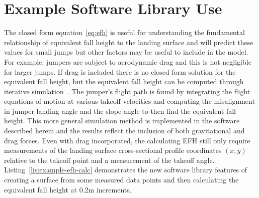 \documentclass[smallextended]{svjour3}       %
\begin{document}
\section{Example Software Library Use}
\label{sec:example}
%
The closed form equation~\ref{eq:efh} is useful for understanding the
fundamental relationship of equivalent fall height to the landing surface and
will predict these values for small jumps but other factors may be useful to
include in the model. For example, jumpers are subject to aerodynamic drag and
this is not negligible for larger jumps. If drag is included there is no closed
form solution for the equivalent fall height, but the equivalent fall height
can be computed through iterative simulation~\cite{Levy2015}. The jumper's
flight path is found by integrating the flight equations of motion at various
takeoff velocities and computing the misalignment in jumper landing angle and
the slope angle to then find the equivalent fall height. This more general
simulation method is implemented in the software described herein and the
results reflect the inclusion of both gravitational and drag forces. Even with
drag incorporated, the calculating EFH still only require measurements of the
landing surface cross-sectional profile coordinates $(x,y)$ relative to the
takeoff point and a measurement of the takeoff angle.
Listing~\ref{lis:example-efh-calc} demonstrates the new software library
features of creating a surface from some measured data points and then
calculating the equivalent fall height at 0.2\si{\meter} increments.
%
\end{document}
